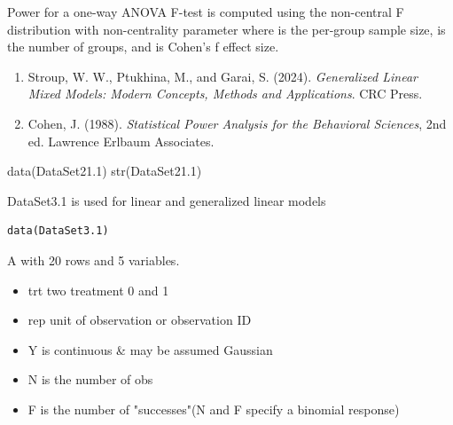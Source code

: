 \documentclass[a4paper]{book}
\begin{document}
%
\begin{Details}
Power for a one-way ANOVA F-test is computed using the non-central F
distribution with non-centrality parameter
where  is the per-group sample size,  is the number of
groups, and  is Cohen's f effect size.
\end{Details}
%
\begin{References}
\begin{enumerate}

\item{} Stroup, W. W., Ptukhina, M., and Garai, S. (2024).
\emph{Generalized Linear Mixed Models: Modern Concepts,
Methods and Applications}. CRC Press.
\item{} Cohen, J. (1988).
\emph{Statistical Power Analysis for the Behavioral Sciences},
2nd ed. Lawrence Erlbaum Associates.

\end{enumerate}

\end{References}
%
\begin{SeeAlso}
\end{SeeAlso}
%
\begin{Examples}
\begin{ExampleCode}
data(DataSet21.1)
str(DataSet21.1)
\end{ExampleCode}
\end{Examples}
%
\begin{Description}
DataSet3.1 is used for linear and generalized linear models
\end{Description}
%
\begin{Usage}
\begin{verbatim}
data(DataSet3.1)
\end{verbatim}
\end{Usage}
%
\begin{Format}
A  with 20 rows and 5 variables.
\end{Format}
%
\begin{Details}
\begin{itemize}

\item{} trt two treatment 0 and 1
\item{} rep unit of observation or observation ID
\item{} Y  is continuous \& may be assumed Gaussian
\item{} N  is the number of obs
\item{} F  is the number of "successes"(N and F specify a binomial response)

\end{itemize}

\end{Details}
\end{document}
